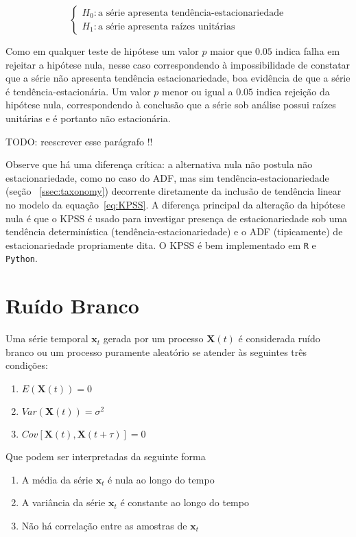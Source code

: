$$
\begin{cases}
    H_0: \text{a série apresenta tendência-estacionariedade} \\
    H_1: \text{a série apresenta raízes unitárias}
\end{cases}
$$

Como em qualquer teste de hipótese um valor $p$ maior que $0.05$ indica falha
em rejeitar a hipótese nula, nesse caso correspondendo à impossibilidade de
constatar que a série não apresenta tendência estacionariedade, boa evidência
de que a série é tendência-estacionária. Um valor $p$ menor ou igual a $0.05$
indica rejeição da hipótese nula, correspondendo à conclusão que a série sob
análise possui raízes unitárias e é portanto não estacionária.

TODO: reescrever esse parágrafo !!

Observe que há uma diferença crítica: a alternativa nula não postula não
estacionariedade, como no caso do ADF, mas sim tendência-estacionariedade
(seção ~\ref{ssec:taxonomy}) decorrente diretamente da inclusão de tendência
linear no modelo da equação~\ref{eq:KPSS}. A diferença principal da alteração
da hipótese nula é que o KPSS é usado para investigar presença de
estacionariedade sob uma tendência determinística (tendência-estacionariedade)
e o ADF (tipicamente) de estacionariedade propriamente dita. O KPSS é bem
implementado em \verb+R+ e \verb+Python+.

\section{Ruído Branco}\label{sec:white_noise}

Uma série temporal $\mathbf{x}_t$ gerada por um processo $\mathbf{X}(t)$ é
considerada ruído branco ou um processo puramente aleatório se atender às
seguintes três condições:

\begin{enumerate}
    \item $E(\mathbf{X}(t)) = 0$
    \item $Var(\mathbf{X}(t)) = \sigma^2$
    \item $Cov[\mathbf{X}(t), \mathbf{X}(t+\tau)] = 0$
\end{enumerate}\vspace{.5cm}

Que podem ser interpretadas da seguinte forma

\begin{enumerate}
    \item A média da série $\mathbf{x}_t$ é nula ao longo do tempo
    \item A variância da série $\mathbf{x}_t$ é constante ao longo do tempo
    \item Não há correlação entre as amostras de $\mathbf{x}_t$
\end{enumerate}\vspace{.5cm}

